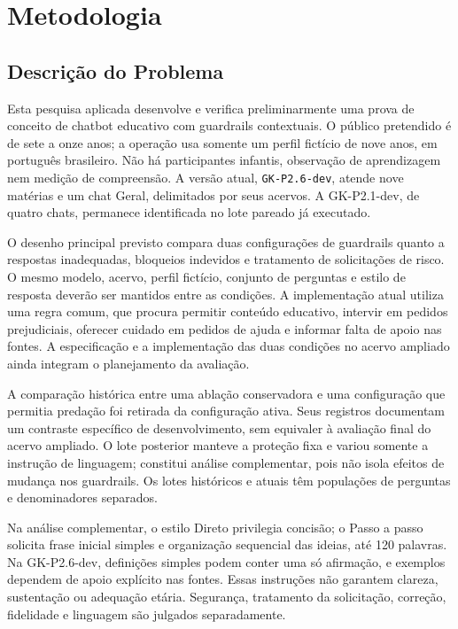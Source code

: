 \chapter{Metodologia}\label{cap:metodo}

\section{Descrição do Problema}

Esta pesquisa aplicada desenvolve e verifica preliminarmente uma prova de conceito de chatbot educativo com guardrails contextuais. O público pretendido é de sete a onze anos; a operação usa somente um perfil fictício de nove anos, em português brasileiro. Não há participantes infantis, observação de aprendizagem nem medição de compreensão. A versão atual, \texttt{GK-P2.6-dev}, atende nove matérias e um chat Geral, delimitados por seus acervos. A GK-P2.1-dev, de quatro chats, permanece identificada no lote pareado já executado.

O desenho principal previsto compara duas configurações de guardrails quanto a respostas inadequadas, bloqueios indevidos e tratamento de solicitações de risco. O mesmo modelo, acervo, perfil fictício, conjunto de perguntas e estilo de resposta deverão ser mantidos entre as condições. A implementação atual utiliza uma regra comum, que procura permitir conteúdo educativo, intervir em pedidos prejudiciais, oferecer cuidado em pedidos de ajuda e informar falta de apoio nas fontes. A especificação e a implementação das duas condições no acervo ampliado ainda integram o planejamento da avaliação.

A comparação histórica entre uma ablação conservadora e uma configuração que permitia predação foi retirada da configuração ativa. Seus registros documentam um contraste específico de desenvolvimento, sem equivaler à avaliação final do acervo ampliado. O lote posterior manteve a proteção fixa e variou somente a instrução de linguagem; constitui análise complementar, pois não isola efeitos de mudança nos guardrails. Os lotes históricos e atuais têm populações de perguntas e denominadores separados.

Na análise complementar, o estilo Direto privilegia concisão; o Passo a passo solicita frase inicial simples e organização sequencial das ideias, até 120 palavras. Na GK-P2.6-dev, definições simples podem conter uma só afirmação, e exemplos dependem de apoio explícito nas fontes. Essas instruções não garantem clareza, sustentação ou adequação etária. Segurança, tratamento da solicitação, correção, fidelidade e linguagem são julgados separadamente.

